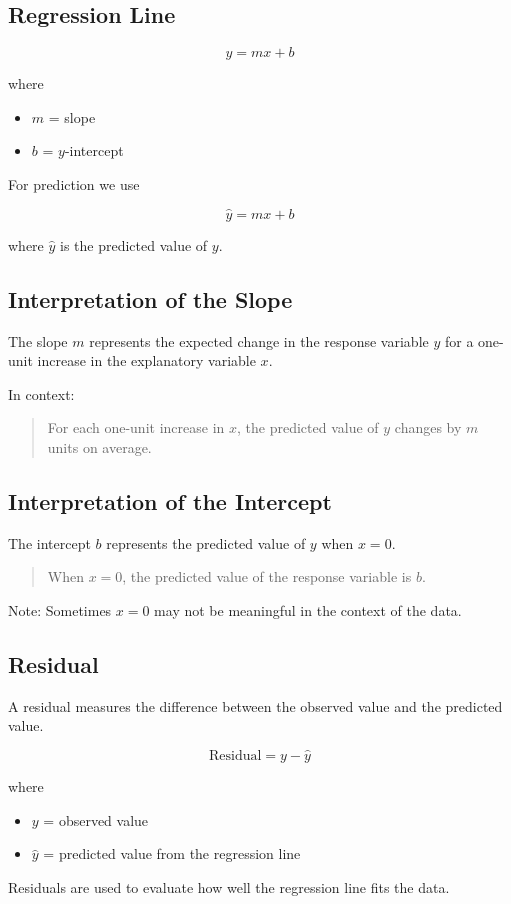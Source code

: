 \documentclass[11pt]{article}
\begin{document}
\subsection*{Regression Line}

\[
y = mx + b
\]

where

\begin{itemize}
\item $m$ = slope
\item $b$ = $y$-intercept
\end{itemize}

For prediction we use

\[
\hat{y} = mx + b
\]

where $\hat{y}$ is the predicted value of $y$.

\subsection*{Interpretation of the Slope}

The slope $m$ represents the expected change in the response variable $y$ for a one-unit increase in the explanatory variable $x$.

In context:

\begin{quote}
For each one-unit increase in $x$, the predicted value of $y$ changes by $m$ units on average.
\end{quote}

\subsection*{Interpretation of the Intercept}

The intercept $b$ represents the predicted value of $y$ when $x = 0$.

\begin{quote}
When $x = 0$, the predicted value of the response variable is $b$.
\end{quote}

Note: Sometimes $x=0$ may not be meaningful in the context of the data.

\subsection*{Residual}

A residual measures the difference between the observed value and the predicted value.

\[
\text{Residual} = y - \hat{y}
\]

where

\begin{itemize}
\item $y$ = observed value
\item $\hat{y}$ = predicted value from the regression line
\end{itemize}

Residuals are used to evaluate how well the regression line fits the data.
\end{document}

